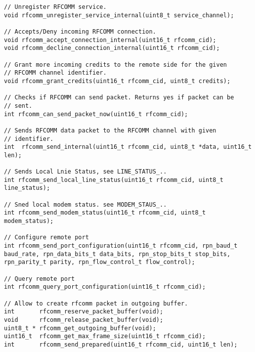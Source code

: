 \begin{lstlisting}
// Unregister RFCOMM service.
void rfcomm_unregister_service_internal(uint8_t service_channel);

// Accepts/Deny incoming RFCOMM connection.
void rfcomm_accept_connection_internal(uint16_t rfcomm_cid);
void rfcomm_decline_connection_internal(uint16_t rfcomm_cid);

// Grant more incoming credits to the remote side for the given 
// RFCOMM channel identifier.
void rfcomm_grant_credits(uint16_t rfcomm_cid, uint8_t credits);

// Checks if RFCOMM can send packet. Returns yes if packet can be 
// sent.
int rfcomm_can_send_packet_now(uint16_t rfcomm_cid);

// Sends RFCOMM data packet to the RFCOMM channel with given 
// identifier.
int  rfcomm_send_internal(uint16_t rfcomm_cid, uint8_t *data, uint16_t len);

// Sends Local Lnie Status, see LINE_STATUS_..
int rfcomm_send_local_line_status(uint16_t rfcomm_cid, uint8_t line_status);

// Sned local modem status. see MODEM_STAUS_..
int rfcomm_send_modem_status(uint16_t rfcomm_cid, uint8_t modem_status);

// Configure remote port 
int rfcomm_send_port_configuration(uint16_t rfcomm_cid, rpn_baud_t baud_rate, rpn_data_bits_t data_bits, rpn_stop_bits_t stop_bits, rpn_parity_t parity, rpn_flow_control_t flow_control);

// Query remote port 
int rfcomm_query_port_configuration(uint16_t rfcomm_cid);

// Allow to create rfcomm packet in outgoing buffer.
int       rfcomm_reserve_packet_buffer(void);
void      rfcomm_release_packet_buffer(void);
uint8_t * rfcomm_get_outgoing_buffer(void);
uint16_t  rfcomm_get_max_frame_size(uint16_t rfcomm_cid);
int       rfcomm_send_prepared(uint16_t rfcomm_cid, uint16_t len);
\end{lstlisting}
\pagebreak
